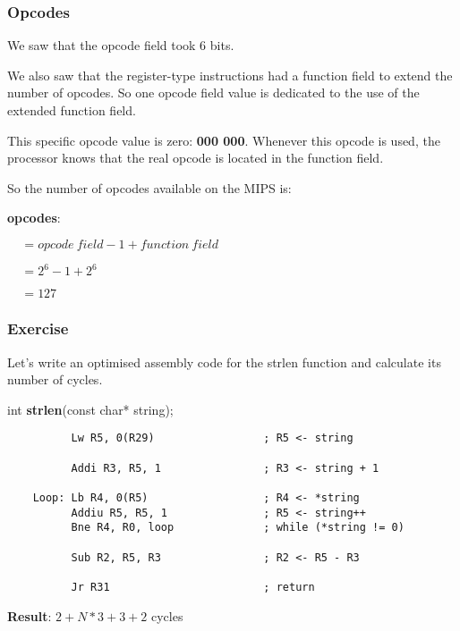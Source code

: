 
\begin{frame}
  \frametitle{Opcodes}

  We saw that the opcode field took 6 bits.

  \-

  We also saw that the register-type instructions had a function field
  to extend the number of opcodes. So one opcode field value is
  dedicated to the use of the extended function field.

  \-

  This specific opcode value is zero: \textbf{000 000}. Whenever this
  opcode is used, the processor knows that the real opcode is located
  in the function field.

  \-

  So the number of opcodes available on the MIPS is:

  \-

  \textbf{opcodes}:

  $~~~~~= opcode~field - 1 + function~field$

  $~~~~~= 2^{6} - 1 + 2^{6}$

  $~~~~~= 127$
\end{frame}

%
%

\begin{frame}[containsverbatim]
  \frametitle{Exercise}

  Let's write an optimised assembly code for the strlen function and
  calculate its number of cycles.

  \-

  int \textbf{strlen}(const char* string);

  \begin{verbatim}
          Lw R5, 0(R29)                 ; R5 <- string

          Addi R3, R5, 1                ; R3 <- string + 1

    Loop: Lb R4, 0(R5)                  ; R4 <- *string
          Addiu R5, R5, 1               ; R5 <- string++
          Bne R4, R0, loop              ; while (*string != 0)

          Sub R2, R5, R3                ; R2 <- R5 - R3

          Jr R31                        ; return
  \end{verbatim}

  \textbf{Result}: $2 + N * 3 + 3 + 2$ cycles
\end{frame}

